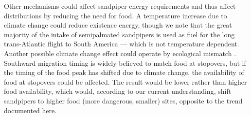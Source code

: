 Other mechanisms could affect sandpiper energy requirements and thus affect distributions by reducing the need for food. A temperature increase due to climate change could reduce existence energy, though we note that the great majority of the intake of semipalmated sandpipers is used as fuel for the long trans-Atlantic flight to South America --- which is not temperature dependent. Another possible climate change effect could operate by ecological mismatch \citep{Jones2010}. Southward migration timing is widely believed to match food at stopovers, but if the timing of the food peak has shifted due to climate change, the availability of food at stopovers could be affected. The result would be lower rather than higher food availability, which would, according to our current understanding, shift sandpipers to higher food (more dangerous, smaller) sites, opposite to the trend documented here.





